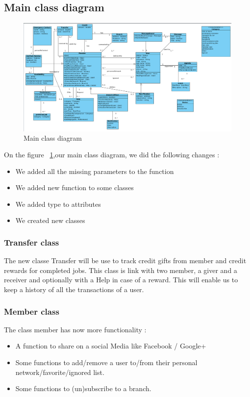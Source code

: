 \documentclass[11pt, a4paper]{article}   	%
\begin{document}
\subsection{Main class diagram}

\begin{figure}[!ht]
   \includegraphics[width=\textwidth]{phase3MainClassDiagram.png}
   \caption{\label{phase3MainClassDiagram} Main class diagram}
\end{figure}


On the figure ~\ref{phase3MainClassDiagram},our main class diagram, we did the following changes :

\begin{itemize}
\item We added all the missing parameters to the function
\item We added new function to some classes 
\item We added type to attributes
\item We created new classes
\end{itemize}

\subsubsection{Transfer class}

The new classe Transfer will be use to track credit gifts from member and credit rewards for completed jobs. This class is link with two member, a giver and a receiver and optionally with a Help in case of a reward. This will enable us to keep a history of all the transactions of a user.

\subsubsection{Member class}

The class member has now more functionality :
\begin{itemize}
\item A function to share on a social Media like Facebook / Google+
\item Some functions to add/remove a user to/from their personal network/favorite/ignored list.
\item Some functions to (un)subscribe to a branch.
\end{itemize}
\end{document}
